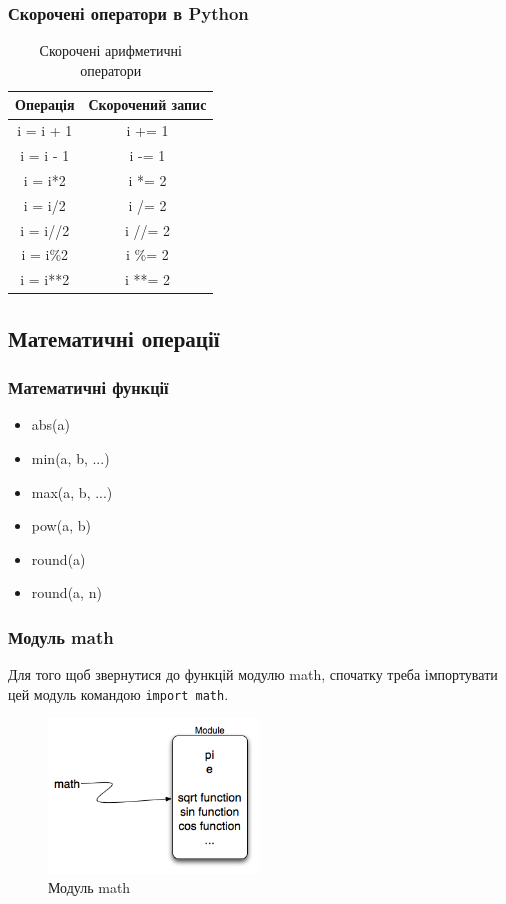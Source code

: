 \begin{frame}
\frametitle{Скорочені оператори в Python}
\begin{table}
  \caption{Скорочені арифметичні оператори}
  \label{tab:}

  \begin{center}
    \begin{tabular}{|c|c|}
      \hline
      \textbf{Операція} & \textbf{Скорочений запис} \\
      \hline
      i = i + 1 & i += 1 \\
       \hline
      i = i - 1 & i -= 1 \\
       \hline
      i = i*2 & i *= 2  \\
       \hline
      i = i/2 & i /= 2 \\
       \hline
      i = i//2 & i //= 2 \\
       \hline
      i = i\%2  & i \%= 2 \\
       \hline
      i = i**2 & i **= 2 \\
       \hline
    \end{tabular}
  \end{center}
\end{table}
\end{frame}

\subsection{Математичні операції}

\begin{frame}
\frametitle{Математичні функції}
\begin{itemize}
  \item abs(a)
  \item min(a, b, ...)
  \item max(a, b, ...)
  \item pow(a, b)
  \item round(a)
  \item round(a, n)
\end{itemize} 
  
\end{frame}

\begin{frame}
\frametitle{Модуль math}
Для того щоб звернутися до функцій модулю math, спочатку треба імпортувати цей модуль командою \texttt{import math}.
\begin{figure}
\begin{center}
 \includegraphics[width=0.5\textwidth]{pictures/mathmod.png}
\caption{Модуль math}
\label{mathmodule} 
\end{center}
\end{figure}
\end{frame}

